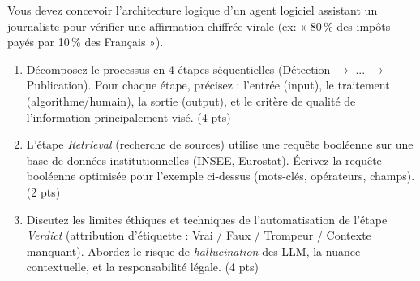 \documentclass[11pt]{article}
\begin{document}
\begin{exercice}
Vous devez concevoir l'architecture logique d'un agent logiciel assistant un journaliste pour vérifier une affirmation chiffrée virale (ex: « 80\,\% des impôts payés par 10\,\% des Français »).
\begin{enumerate}
    \item Décomposez le processus en 4 étapes séquentielles (Détection $\rightarrow$ ... $\rightarrow$ Publication). Pour chaque étape, précisez : l'entrée (input), le traitement (algorithme/humain), la sortie (output), et le critère de qualité de l'information principalement visé. \hfill (4 pts)
    \item L'étape \textit{Retrieval} (recherche de sources) utilise une requête booléenne sur une base de données institutionnelles (INSEE, Eurostat). Écrivez la requête booléenne optimisée pour l'exemple ci-dessus (mots-clés, opérateurs, champs). \hfill (2 pts)
    \item Discutez les limites éthiques et techniques de l'automatisation de l'étape \textit{Verdict} (attribution d'étiquette : Vrai / Faux / Trompeur / Contexte manquant). Abordez le risque de \textit{hallucination} des LLM, la nuance contextuelle, et la responsabilité légale. \hfill (4 pts)
\end{enumerate}
\end{exercice}
\end{document}
